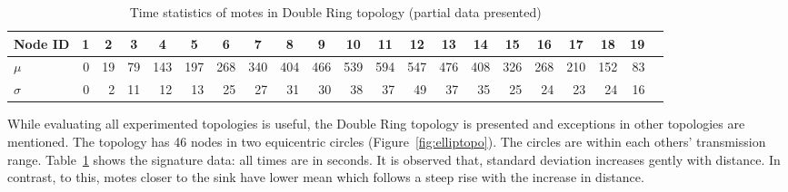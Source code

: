 \documentclass{CRPITStyle}
\newcommand*{\bd}[1]{\multicolumn{1}{|c|}{\bfseries #1}}
\begin{document}
\begin{table}[t!]
\centering
\begin{tabular}{|l|*{19}{r|}r|}
\hline
\bd{Node ID}           & \bd{1} & \bd{2} & \bd{3} & \bd{4} & \bd{5} & \bd{6} & \bd{7} & \bd{8} & \bd{9} & \bd{10} & \bd{11} & \bd{12} & \bd{13} & \bd{14} & \bd{15} & \bd{16} & \bd{17} & \bd{18} & \bd{19} \\ %
\hline
$\mu$            & 0 &19 & 79& 143&197 &268&340&404&466&539 &594 &547 &476 &408 &326 & 268&210 & 152 & 83 \\ %
$\sigma$		 & 0 & 2 & 11 & 12 & 13 & 25& 27&31 &30 & 38 & 37 & 49 & 37 & 35 & 25  & 24 & 23 & 24 & 16 \\ %
\hline
\end{tabular}
\caption{Time statistics of motes in Double Ring topology (partial data presented)}
\label{tab:stat_ellip}
\end{table}


While evaluating all experimented topologies is useful, the Double Ring topology is presented and  exceptions in other topologies are mentioned.
The topology has 46 nodes in two equicentric circles (Figure~\ref{fig:elliptopo}).
The circles are within each others' transmission range.
Table~\ref{tab:stat_ellip} shows the signature data: all times are in seconds.
It is observed that, standard deviation increases gently with distance.
In contrast, to this, %
motes closer to the sink have lower mean which follows a steep rise with the increase in distance.
\end{document}
